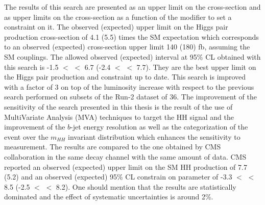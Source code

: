 The results of this search are presented as an upper limit on the cross-section and as upper limits on the cross-section as a function of the \kl modifier to set a constraint on it. The observed (expected) upper limit on the Higgs pair production cross-section of 4.1 (5.5) times the SM expectation which corresponds to an observed (expected) cross-section upper limit 140 (180) fb, assuming the SM couplings. The allowed observed (expected) interval at 95\% CL obtained with this search is -1.5 $<$ \kl $<$ 6.7 (-2.4 $<$ \kl $<$ 7.7). They are the best upper limit on the Higgs pair production and \kl constraint up to date. This search is improved with a factor of 3 on top of the luminosity increase with respect to the previous search performed on subsets of the Run-2 dataset of 36\ifb. The improvement of the sensitivity of the search presented in this thesis is the result of the use of MultiVariate Analysis (MVA) techniques to target the HH signal and the improvement of the $b$-jet energy resolution as well as the categorization of the event over the $m_{HH}$ invariant distribution which enhances the sensitivity to \kl measurement. The results are compared to the one obtained by CMS collaboration in the same decay channel with the same amount of data. CMS reported an observed (expected) upper limit on the SM HH production of 7.7 (5.2) and an observed (expected) 95\% CL constrain on \kl parameter of -3.3 $<$ \kl $<$ 8.5 (-2.5 $<$ \kl $<$ 8.2). One should mention that the results are statistically dominated and the effect of systematic uncertainties is around 2\%. \\

